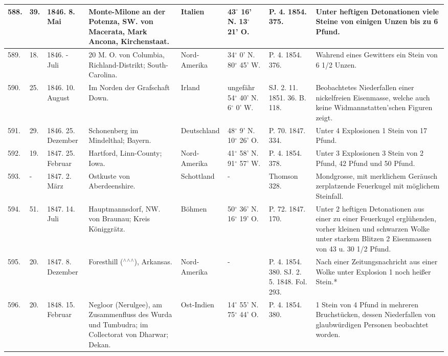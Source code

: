 \documentclass[a4paper, 11pt, oneside, polutonikogreek, german]{article}
\begin{document}
\begin{table}[!ht]
\begin{tabular}{|l|l|l|l|l|l|l|l|}
        588. & 39. & 1846. 8. Mai & Monte-Milone an der Potenza, SW. von Macerata, Mark Ancona, Kirchenstaat. & Italien & 43$^\circ$ 16' N. 13$^\circ$ 21' O. & P. 4. 1854. 375. & Unter heftigen Detonationen viele Steine von einigen Unzen bis zu 6 Pfund. \\ \hline
        589. & 18. & 1846. - Juli & 20 M. O. von Columbia, Richland-Distrikt; South-Carolina. & Nord-Amerika & 34$^\circ$ 0' N. 80$^\circ$ 45' W. & P. 4. 1854. 376. & Wahrend eines Gewitters ein Stein von 6 1/2 Unzen. \\ \hline
        590. & 25. & 1846. 10. August & Im Norden der Grafschaft Down. & Irland & ungefähr 54$^\circ$ 40' N. 6$^\circ$ 0' W. & SJ. 2. 11. 1851. 36. B. 118. & Beobachtetes Niederfallen einer nickelfreien Eisenmasse, welche auch keine Widmannstatten'schen Figuren zeigt. \\ \hline
        591. & 29. & 1846. 25. Dezember & Schonenberg im Mindelthal; Bayern. & Deutschland & 48$^\circ$ 9' N. 10$^\circ$ 26' O. & P. 70. 1847. 334. & Unter 4 Explosionen 1 Stein von 17 Pfund. \\ \hline
        592. & 19. & 1847. 25. Februar & Hartford, Linn-County; Iowa. & Nord-Amerika & 41$^\circ$ 58' N. 91$^\circ$ 57' W. & P. 4. 1854. 378. & Unter 3 Explosionen 3 Stein von 2 Pfund, 42 Pfund und 50 Pfund. \\ \hline
        593. & - & 1847. 2. März & Ostkuste von Aberdeenshire. & Schottland & - & Thomson 328. & Mondgrosse, mit merklichem Geräusch zerplatzende Feuerkugel mit möglichem Steinfall. \\ \hline
        594. & 51. & 1847. 14. Juli & Hauptmannsdorf, NW. von Braunau; Kreis Königgrätz. & Böhmen & 50$^\circ$ 36' N. 16$^\circ$ 19' O. & P. 72. 1847. 170. & Unter 2 heftigen Detonationen aus einer zu einer Feuerkugel erglühenden, vorher kleinen und schwarzen Wolke unter starkem Blitzen 2 Eisenmassen von 43 u. 30 1/2 Pfund. \\ \hline
        595. & 20. & 1847. 8. Dezember & Foresthill ($^\wedge$$^\wedge$$^\wedge$), Arkansas. & Nord-Amerika & - & P. 4. 1854. 380. SJ. 2. 5. 1848. Fol. 293. & Nach einer Zeitungsnachricht aus einer Wolke unter Explosion 1 noch heißer Stein.* \\ \hline
        596. & 20. & 1848. 15. Februar & Negloor (Nerulgee), am Zusammenfluss des Wurda und Tumbudra; im Collectorat von Dharwar; Dekan. & Ost-Indien & 14$^\circ$ 55' N. 75$^\circ$ 44' O. & P. 4. 1854. 380. & 1 Stein von 4 Pfund in mehreren Bruchstücken, dessen Niederfallen von glaubwürdigen Personen beobachtet worden. \\ \hline

\end{tabular}
\end{table}
\end{document}
